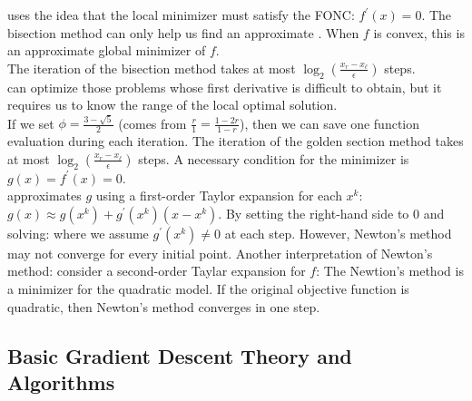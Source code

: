 \documentclass[12pt]{report}
\begin{document}
 uses the idea that the local minimizer must satisfy the FONC: $f^{\prime}(x)=0.$
The bisection method can only help us find an approximate . When $f$ is convex, this is an approximate global minimizer of $f$.\\
The iteration of the bisection method takes at most $\log_2(\frac{x_r-x_\ell}\epsilon)$ steps.\\
 can optimize those problems whose first derivative is difficult to obtain, but it requires us to know the range of the local optimal solution.\\
If we set $\phi=\frac{3-\sqrt{5}}2$ (comes from $\frac{r}{1}=\frac{1-2r}{1-r}$), then we can save one function evaluation during each iteration.
The iteration of the golden section method takes at most $\log_2(\frac{x_r-x_\ell}\epsilon)$ steps. A necessary condition for the minimizer is $g(x)=f^\prime(x)=0$. \\
 approximates $g$ using a first-order
Taylor expansion for each $x^k$: $g(x)\approx g(x^k)+g^{\prime}(x^k)(x-x^k).$ By setting the right-hand side to 0 and solving:
where we assume $g^\prime(x^k)\ne0$ at each step. However, Newton's method may not converge for every initial point.
Another interpretation of Newton's method: consider a second-order Taylar expansion for $f$:
The Newtion's method is a minimizer for the quadratic model. If the original objective function is quadratic, then Newton's method converges in one step.

\subsection{Basic Gradient Descent Theory and Algorithms}
\end{document}
